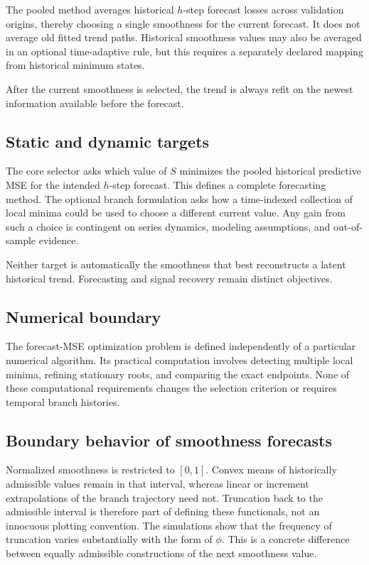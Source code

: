 The pooled method averages historical $h$-step forecast losses across validation origins, thereby choosing a single smoothness for the current forecast. It does not average old fitted trend paths. Historical smoothness values may also be averaged in an optional time-adaptive rule, but this requires a separately declared mapping from historical minimum states.

After the current smoothness is selected, the trend is always refit on the newest information available before the forecast.

\subsection{Static and dynamic targets}

The core selector asks which value of $S$ minimizes the pooled historical predictive MSE for the intended $h$-step forecast. This defines a complete forecasting method. The optional branch formulation asks how a time-indexed collection of local minima could be used to choose a different current value. Any gain from such a choice is contingent on series dynamics, modeling assumptions, and out-of-sample evidence.

Neither target is automatically the smoothness that best reconstructs a latent historical trend. Forecasting and signal recovery remain distinct objectives.

\subsection{Numerical boundary}

The forecast-MSE optimization problem is defined independently of a particular numerical algorithm. Its practical computation involves detecting multiple local minima, refining stationary roots, and comparing the exact endpoints. None of these computational requirements changes the selection criterion or requires temporal branch histories.


\subsection{Boundary behavior of smoothness forecasts}

Normalized smoothness is restricted to $[0,1]$. Convex means of historically
admissible values remain in that interval, whereas linear or increment
extrapolations of the branch trajectory need not. Truncation back to the
admissible interval is therefore part of defining these functionals,
not an innocuous plotting convention. The simulations show that the
frequency of truncation varies substantially with the form of $\phi$.
This is a concrete difference between equally admissible constructions
of the next smoothness value.

